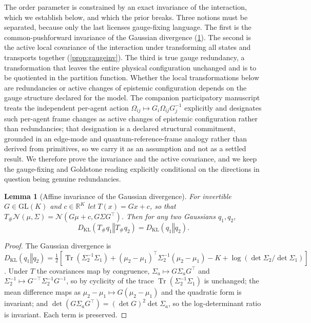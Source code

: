 \documentclass[11pt]{article}
\theoremstyle{plain}
\newtheorem{lemma}{Lemma}[section]
\theoremstyle{definition}
\newcommand{\KL}[2]{D_{\mathrm{KL}}\mathopen{}\left(#1 \mathbin{\Vert} #2\right)\mathclose{}}
\newcommand{\Tr}{\operatorname{Tr}}
\newcommand{\R}{\mathbb{R}}
\newcommand{\GL}{\mathrm{GL}}
\newcommand{\Ncal}{\mathcal{N}}
\newcommand{\Omegaij}{\Omega_{ij}}
\begin{document}
The order parameter is constrained by an exact invariance of the interaction, which we
establish below, and which the prior breaks. Three notions must be separated, because
only the last licenses gauge-fixing language. The first is the common-pushforward
invariance of the Gaussian divergence (\cref{lem:affine}). The second is the active
local covariance of the interaction under transforming all states and transports together
(\cref{prop:gaugeinv}). The third is true gauge redundancy, a transformation that leaves
the entire physical configuration unchanged and is to be quotiented in the partition
function. Whether the local transformations below are redundancies or active changes of
epistemic configuration depends on the gauge structure declared for the model. The
companion participatory manuscript treats the independent per-agent action
$\Omegaij\mapsto G_i\Omegaij G_j^{-1}$ explicitly and designates such per-agent frame
changes as active changes of epistemic configuration rather than redundancies; that
designation is a declared structural commitment, grounded in an edge-mode and
quantum-reference-frame analogy rather than derived from primitives, so we carry it as an
assumption and not as a settled result. We therefore prove the invariance and the active covariance, and we
keep the gauge-fixing and Goldstone reading explicitly conditional on the directions in
question being genuine redundancies.

\begin{lemma}[Affine invariance of the Gaussian divergence]
\label{lem:affine}
For invertible $G\in\GL(K)$ and $c\in\R^{K}$ let $T(x)=Gx+c$, so that
$T_{\#}\Ncal(\mu,\Sigma)=\Ncal(G\mu+c,G\Sigma G^{\top})$. Then for any two Gaussians
$q_1,q_2$,
\begin{equation}
\KL{T_{\#}q_1}{T_{\#}q_2}=\KL{q_1}{q_2}.
\end{equation}
\end{lemma}

\begin{proof}
The Gaussian divergence is
$\KL{q_1}{q_2}=\tfrac12[\Tr(\Sigma_2^{-1}\Sigma_1)+(\mu_2-\mu_1)^{\top}\Sigma_2^{-1}(\mu_2-\mu_1)-K+\log(\det\Sigma_2/\det\Sigma_1)]$.
Under $T$ the covariances map by congruence, $\Sigma_a\mapsto G\Sigma_a G^{\top}$ and
$\Sigma_2^{-1}\mapsto G^{-\top}\Sigma_2^{-1}G^{-1}$, so by cyclicity of the trace
$\Tr(\Sigma_2^{-1}\Sigma_1)$ is unchanged; the mean difference maps as
$\mu_2-\mu_1\mapsto G(\mu_2-\mu_1)$ and the quadratic form is invariant; and
$\det(G\Sigma_a G^{\top})=(\det G)^2\det\Sigma_a$, so the log-determinant ratio is
invariant. Each term is preserved.
\end{proof}
\end{document}
